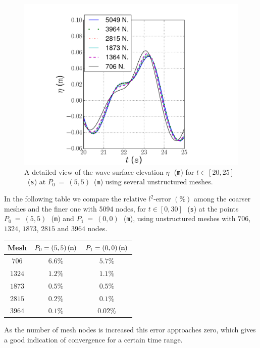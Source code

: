 \begin{figure}
{\centering
\includegraphics[width=\largefig]{chapters/lopes/pdf/detail_unstr.pdf}
\caption{A detailed view   of the wave surface elevation $\eta$\,~({\tt m})
for $t\in[20,25]$~({\tt s}) at
$P_0~=~(5,5)$~({\tt m}) using several unstructured meshes.}\par}
\label{fig:lopes:unstdetail}
\end{figure}

In the following table we compare the relative $l^2$-error $(\%)$ among the coarser
meshes and the finer one with 5094 nodes,
for $t\in[0,30]$\,~({\tt s}) at the points
$P_0~=~(5,5)$\,~({\tt m}) and $P_1~=~(0,0)$\,~({\tt m}),  using
unstructured meshes with $706$, $1324$, $1873$, $2815$ and $3964$ nodes.
\smallskip
\begin{center}
\renewcommand{\arraystretch}{1.3}
\begin{tabular}{|c|c|c|}
\hline Mesh & $P_0=(5,5)\,({\tt m})$ & $P_1=(0,0)\,({\tt m})$\\ \hline
$706$ &$6.6\%$ & $5.7\%$ \\
\hline $1324$  &$1.2\%$    &$1.1\%$ \\
\hline  $1873$ & $0.5\%$   & $0.5\%$ \\
\hline $2815$ & $0.2\%$  &$0.1\%$  \\
\hline $3964$ & $0.1\%$    &$0.02\%$\\ \hline
\end{tabular}
\end{center}
\smallskip
As the number  of mesh nodes is increased this error
approaches zero, which gives a good indication of convergence
for a certain time range.



